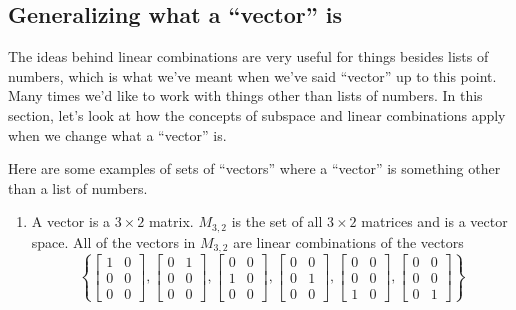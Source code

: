 \subsection{Generalizing what a ``vector'' is}

The ideas behind linear combinations are very useful for things besides lists of numbers, which is what we've meant when we've said ``vector'' up to this point.  Many times we'd like to work with things other than lists of numbers.  In this section, let's look at how the concepts of subspace and linear combinations apply when we change what a ``vector'' is.

\begin{example}
  Here are some examples of sets of ``vectors'' where a ``vector'' is something other than a list of numbers.
  \begin{enumerate}
  \item A vector is a $3\times 2$ matrix.  $M_{3,2}$ is the set of all $3\times 2$ matrices and is a vector space.  All of the vectors in $M_{3,2}$ are linear combinations of the vectors
    \begin{equation*}
      \left\{
      \begin{bmatrix}1&0\\0&0\\0&0\end{bmatrix},
      \begin{bmatrix}0&1\\0&0\\0&0\end{bmatrix},
      \begin{bmatrix}0&0\\1&0\\0&0\end{bmatrix},
      \begin{bmatrix}0&0\\0&1\\0&0\end{bmatrix},
      \begin{bmatrix}0&0\\0&0\\1&0\end{bmatrix},
      \begin{bmatrix}0&0\\0&0\\0&1\end{bmatrix}
      \right\}
  \end{equation*}


\end{enumerate}
\end{example}
